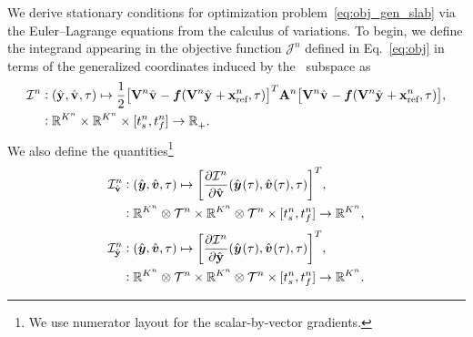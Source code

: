 We derive stationary conditions for optimization problem~\eqref{eq:obj_gen_slab} via 
	the Euler--Lagrange equations from the
calculus of variations. To begin, we define the
integrand appearing in the objective function $\mathcal{J}^n$ defined in Eq.~\eqref{eq:obj} in terms of the generalized
coordinates induced by the \spatialAcronym\ subspace as 
\begin{equation}\label{eq:integrand}
\begin{split}
 \minintegrandArg{n} & \vcentcolon
(\genstateyDiscreteArgnt{}, \genstateyDiscreteDotArgnt{},\timeDummy) \mapsto \frac{1}{2} \big[
\basisspaceArg{n} \genstateyDiscreteDotArgnt{} - \velocity(\basisspaceArg{n} \genstateyDiscreteArgnt{}
+ \stateInterceptArg{n},\timeDummy ) \big]^T \stweightingMatArgt{n}{t} \big[
\basisspaceArg{n} \genstateyDiscreteDotArgnt{}  - \velocity(\basisspaceArg{n} \genstateyDiscreteArgnt{} +
\stateInterceptArg{n},\timeDummy) \big], \\ & \vcentcolon \RR{\romdimArg{n}} \times \RR{\romdimArg{n}} \times [\timeStartArg{n},\timeEndArg{n}]
 \rightarrow \RRplus .  
\end{split}
\end{equation}
We also define the quantities\footnote{We use numerator layout for the
scalar-by-vector gradients.}
\begin{equation}
\begin{split}
\dIdVArg{n}  & \vcentcolon
(\genstatey , \genstateyDot, \timeDummy) \mapsto \bigg[ \frac{\partial \minintegrandArg{n}}{\partial \genstateyDiscreteDot} (\genstateyArg{}{\timeDummy}, \genstateyDotArg{}{\timeDummy},\timeDummy) \bigg]^T, \\ 
& \vcentcolon  \RR{\romdimArg{n}} \otimes \timeSpaceArg{n} \times \RR{\romdimArg{n}} \otimes \timeSpaceArg{n} \times [\timeStartArg{n},\timeEndArg{n}]
 \rightarrow \RR{\romdimArg{n}} ,
\end{split}
\end{equation}
\begin{equation}
\begin{split}
\dIdYArg{n}  & \vcentcolon
(\genstatey , \genstateyDot, \timeDummy) \mapsto \bigg[ \frac{\partial \minintegrandArg{n}}{\partial \genstateyDiscrete} (\genstateyArg{}{\timeDummy}, \genstateyDotArg{}{\timeDummy},\timeDummy) \bigg]^T, \\ 
& \vcentcolon  \RR{\romdimArg{n}} \otimes \timeSpaceArg{n} \times \RR{\romdimArg{n}} \otimes \timeSpaceArg{n} \times [\timeStartArg{n},\timeEndArg{n}]
 \rightarrow \RR{\romdimArg{n}} .
\end{split}
\end{equation}
